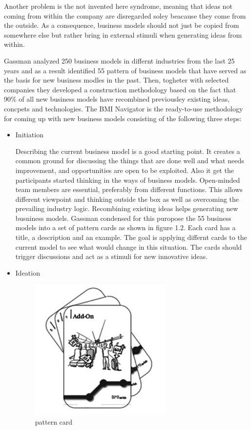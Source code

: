 \begin{itemize}
\begin{itemize}
				Another problem is the not invented here syndrome, meaning that ideas not coming from within the company are disregarded soley beacause they come from the outside. As a consequence, business models should not just be copied from somewhere else but rather bring in external stimuli when generating ideas from within.

				Gassman analyzed 250 business models in differnt industries from the last 25 years and as a result identified 55 pattern of business models that have served as the basis for new business modles in the past. Then, togheter with selected companies they developed a construction methodology based on the fact that 90\% of all new business models have recombined previousley existing ideas, concpets and  technologies.
				The BMI Navigator is the ready-to-use methodology for coming up with new business models consisting of the following three steps:


				\begin{itemize}
					\item Initiation

					Describing the current business model is a good starting point. It creates a common ground for discussing the things that are done well and what needs improvement, and opportunities are open to be exploited. Also it get the participants started thinking in the ways of business models.
					Open-minded team members are essential, preferably from different functions. This allows different viewpoint and thinking outside the box as well as overcoming the prevailing industry logic.
					Recombining existing ideas helps generating new busniness models. Gassman  condensed for this puropose the 55 business models into a set of pattern cards as shown in figure 1.2. Each card has a title, a description and an example. The goal is applying differnt cards to the current model to see what would change in this situation. The cards should trigger discussions and act as a stimuli for new innovative ideas.

					\item Ideation


					\begin{figure}[ht]
						    \begin{center}
						    \includegraphics[scale=0.6]{Talk11/Figure2.png}
						    \end{center}
						    \caption{pattern card}
						    \label{label}
						\end{figure}




\end{itemize}
\end{itemize}
\end{itemize}
